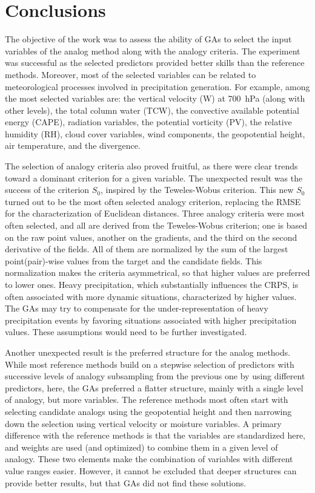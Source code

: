 \documentclass[draft]{agujournal2019}
\begin{document}
\section{Conclusions}
\label{conclusions}

The objective of the work was to assess the ability of GAs to select the input variables of the analog method along with the analogy criteria. The experiment was successful as the selected predictors provided better skills than the reference methods. Moreover, most of the selected variables can be related to meteorological processes involved in precipitation generation. For example, among the most selected variables are: the vertical velocity (W) at 700~hPa (along with other levels), the total column water (TCW), the convective available potential energy (CAPE), radiation variables, the potential vorticity (PV), the relative humidity (RH), cloud cover variables, wind components, the geopotential height, air temperature, and the divergence.

The selection of analogy criteria also proved fruitful, as there were clear trends toward a dominant criterion for a given variable. The unexpected result was the success of the criterion $S_{0}$, inspired by the Teweles-Wobus criterion. This new $S_{0}$ turned out to be the most often selected analogy criterion, replacing the RMSE for the characterization of Euclidean distances. Three analogy criteria were most often selected, and all are derived from the Teweles-Wobus criterion; one is based on the raw point values, another on the gradients, and the third on the second derivative of the fields. All of them are normalized by the sum of the largest point(pair)-wise values from the target and the candidate fields. This normalization makes the criteria asymmetrical, so that higher values are preferred to lower ones. Heavy precipitation, which substantially influences the CRPS, is often associated with more dynamic situations, characterized by higher values. The GAs may try to compensate for the under-representation of heavy precipitation events by favoring situations associated with higher precipitation values. These assumptions would need to be further investigated.

Another unexpected result is the preferred structure for the analog methods. While most reference methods build on a stepwise selection of predictors with successive levels of analogy subsampling from the previous one by using different predictors, here, the GAs preferred a flatter structure, mainly with a single level of analogy, but more variables. The reference methods most often start with selecting candidate analogs using the geopotential height and then narrowing down the selection using vertical velocity or moisture variables. A primary difference with the reference methods is that the variables are standardized here, and weights are used (and optimized) to combine them in a given level of analogy. These two elements make the combination of variables with different value ranges easier. However, it cannot be excluded that deeper structures can provide better results, but that GAs did not find these solutions.
\end{document}
